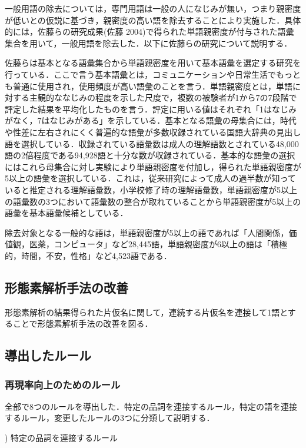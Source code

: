 \documentclass[japanese]{jnlp_1.4}
\begin{document}
一般用語の除去については，専門用語は一般の人になじみが無い，つまり親密度が低いとの仮説に基づき，親密度の高い語を除去することにより実施した．具体的には，佐藤らの研究成果(佐藤 2004)で得られた単語親密度が付与された語彙集合を用いて，一般用語を除去した．以下に佐藤らの研究について説明する．

佐藤らは基本となる語彙集合から単語親密度を用いて基本語彙を選定する研究を行っている．ここで言う基本語彙とは，コミュニケーションや日常生活でもっとも普通に使用され，使用頻度が高い語彙のことを言う．単語親密度とは，単語に対する主観的ななじみの程度を示した尺度で，複数の被験者が1から7の7段階で評定した結果を平均化したものを言う．評定に用いる値はそれぞれ「1はなじみがなく，7はなじみがある」を示している．基本となる語彙の母集合には，時代や性差に左右されにくく普遍的な語彙が多数収録されている国語大辞典の見出し語を選択している．収録されている語彙数は成人の理解語数とされている48,000語の2倍程度である94,928語と十分な数が収録されている．基本的な語彙の選択にはこれら母集合に対し実験により単語親密度を付加し，得られた単語親密度が5以上の語彙を選択している．これは，従来研究によって成人の過半数が知っていると推定される理解語彙数，小学校修了時の理解語彙数，単語親密度が5以上の語彙数の3つにおいて語彙数の整合が取れていることから単語親密度が5以上の語彙を基本語彙候補としている．

除去対象となる一般的な語は，単語親密度が5以上の語であれば「人間関係，価値観，医薬，コンピュータ」など28,445語，単語親密度が6以上の語は「積極的，時間，不安，性格」など4,523語である．

\subsection{形態素解析手法の改善}

形態素解析の結果得られた片仮名に関して，連続する片仮名を連接して1語とすることで形態素解析手法の改善を図る．

\subsection{導出したルール}

\subsubsection{再現率向上のためのルール}

全部で8つのルールを導出した．特定の品詞を連接するルール，特定の語を連接するルール，変更したルールの3つに分類して説明する．

) 特定の品詞を連接するルール
\end{document}
